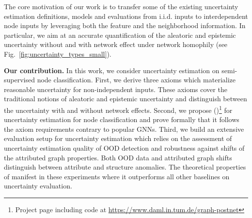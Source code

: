 The core motivation of our work is to transfer some of the existing uncertainty estimation definitions, models and evaluations from i.i.d. inputs to interdependent node inputs by leveraging both the feature and the neighborhood information. In particular, we aim at an accurate quantification of the aleatoric and epistemic uncertainty without and with network effect under network homophily (see Fig.~\ref{fig:uncertainty_types_small}).

\textbf{Our contribution.} In this work, we consider uncertainty estimation on semi-supervised node classification. First, we derive three axioms which materialize reasonable uncertainty for non-independent inputs. These axioms cover the traditional notions of aleatoric and epistemic uncertainty and distinguish between the uncertainty with and without network effects. Second, we propose \GPN{} (\GPNacro{})\footnote{Project page including code at \url{https://www.daml.in.tum.de/graph-postnet}} for uncertainty estimation for node classification and prove formally that it follows the axiom requirements contrary to popular GNNs. Third, we build an extensive evaluation setup for uncertainty estimation which relies on the assessment of uncertainty estimation quality of OOD detection and robustness against shifts of the attributed graph properties. Both OOD data and attributed graph shifts distinguish between attribute and structure anomalies. The theoretical properties of \GPNacro{} manifest in these experiments where it outperforms all other baselines on uncertainty evaluation.

